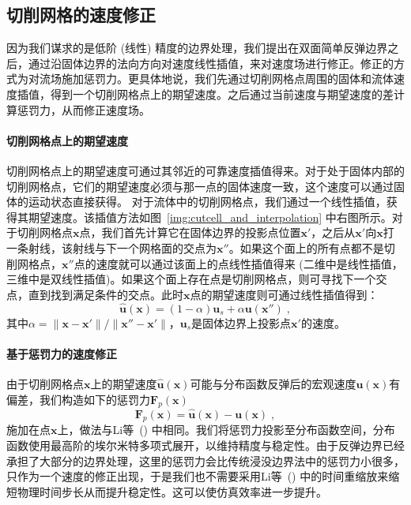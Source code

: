 \subsection{切削网格的速度修正}
因为我们谋求的是低阶 (线性) 精度的边界处理，我们提出在双面简单反弹边界之后，通过沿固体边界的法向方向对速度线性插值，来对速度场进行修正。修正的方式为对流场施加惩罚力。更具体地说，我们先通过切削网格点周围的固体和流体速度插值，得到一个切削网格点上的期望速度。之后通过当前速度与期望速度的差计算惩罚力，从而修正速度场。

\paragraph{切削网格点上的期望速度}
切削网格点上的期望速度可通过其邻近的可靠速度插值得来。对于处于固体内部的切削网格点，它们的期望速度必须与那一点的固体速度一致，这个速度可以通过固体的运动状态直接获得。
对于流体中的切削网格点，我们通过一个线性插值，获得其期望速度。该插值方法如图~\ref{img:cutcell_and_interpolation} 中右图所示。对于切削网格点$\bm{x}$点，我们首先计算它在固体边界的投影点位置$\bm{x}'$，之后从$\bm{x}'$向$\bm{x}$打一条射线，该射线与下一个网格面的交点为$\bm{x}''$。如果这个面上的所有点都不是切削网格点，$\bm{x}''$点的速度就可以通过该面上的点线性插值得来 (二维中是线性插值，三维中是双线性插值)。如果这个面上存在点是切削网格点，则可寻找下一个交点，直到找到满足条件的交点。此时$\bm{x}$点的期望速度则可通过线性插值得到：
\begin{equation}  \label{eq:vel_lerp}
\hat{\bm{u}}(\bm{x})=(1-\alpha)\bm{u}_s + \alpha \bm{u}(\bm{x}'')\;,
\end{equation}
其中$\alpha=\|\bm{x}-\bm{x}'\|/\|\bm{x}''-\bm{x}'\|$，$\bm{u}_s$是固体边界上投影点$\bm{x}'$的速度。

\paragraph{基于惩罚力的速度修正}
由于切削网格点$\bm{x}$上的期望速度$\hat{\bm{u}}(\bm{x})$可能与分布函数反弹后的宏观速度$\bm{u}(\bm{x})$有偏差，我们构造如下的惩罚力$\bm{F}_p(\bm{x})$
\begin{equation} \label{eq:penaltyForce}
\bm{F}_p(\bm{x}) = \hat{\bm{u}}(\bm{x})-\bm{u}(\bm{x})\;,
\end{equation}
施加在点$\bm{x}$上，做法与Li等~(\citeyear{Li-2020}) 中相同。我们将惩罚力投影至分布函数空间，分布函数使用最高阶的埃尔米特多项式展开，以维持精度与稳定性。由于反弹边界已经承担了大部分的边界处理，这里的惩罚力会比传统浸没边界法中的惩罚力小很多，只作为一个速度的修正出现，于是我们也不需要采用Li等~(\citeyear{Li-2020}) 中的时间重缩放来缩短物理时间步长从而提升稳定性。这可以使仿真效率进一步提升。

